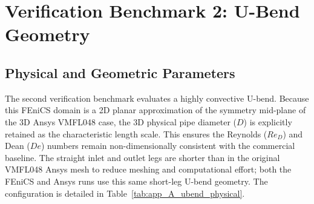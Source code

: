 \FloatBarrier

\section{Verification Benchmark 2: U-Bend Geometry}
\label{sec:app_A_ubend}

\subsection{Physical and Geometric Parameters}
\label{subsec:app_A_ubend_physical}
The second verification benchmark evaluates a highly convective U-bend. Because this FEniCS domain is a 2D planar approximation of the symmetry mid-plane of the 3D Ansys VMFL048 case, the 3D physical pipe diameter ($D$) is explicitly retained as the characteristic length scale. This ensures the Reynolds ($Re_D$) and Dean ($De$) numbers remain non-dimensionally consistent with the commercial baseline. The straight inlet and outlet legs are shorter than in the original VMFL048 Ansys mesh to reduce meshing and computational effort; both the FEniCS and Ansys runs use this same short-leg U-bend geometry. The configuration is detailed in Table~\ref{tab:app_A_ubend_physical}.

